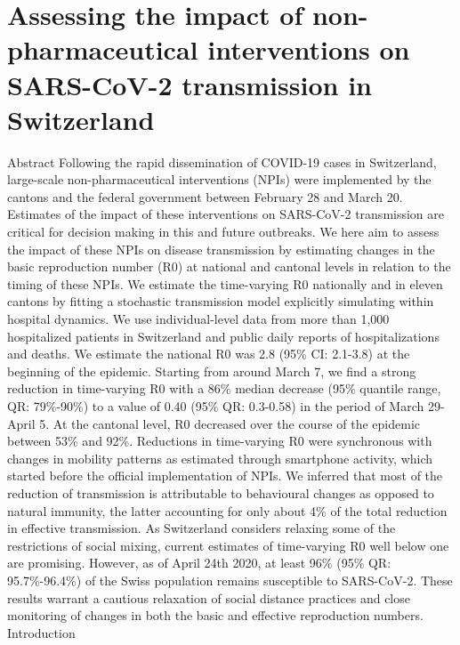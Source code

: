 \chapter{Assessing the impact of non-pharmaceutical interventions on SARS-CoV-2 transmission in Switzerland}
\label{ch:covid-switzerland-npi}

Abstract
Following the rapid dissemination of COVID-19 cases in Switzerland, large-scale non-pharmaceutical interventions (NPIs) were implemented by the cantons and the federal government between February 28 and March 20. Estimates of the impact of these interventions on SARS-CoV-2 transmission are critical for decision making in this and future outbreaks. We here aim to assess the impact of these NPIs on disease transmission by estimating changes in the basic reproduction number (R0) at national and cantonal levels in relation to the timing of these NPIs. We estimate the time-varying R0 nationally and in eleven cantons by fitting a stochastic transmission model explicitly simulating within hospital dynamics. We use  individual-level data from more than 1,000 hospitalized patients in Switzerland and public daily reports of hospitalizations and deaths. We estimate the national R0 was 2.8 (95\% CI: 2.1-3.8) at the beginning of the epidemic. Starting from around March 7, we find a strong reduction in time-varying R0 with a 86\% median decrease (95\% quantile range, QR: 79\%-90\%) to a value of 0.40 (95\% QR: 0.3-0.58) in the period of March 29-April 5. At the cantonal level, R0 decreased over the course of the epidemic between 53\% and 92\%. Reductions in time-varying R0 were synchronous with changes in mobility patterns as estimated through smartphone activity, which started before the official implementation of NPIs. We inferred that most of the reduction of transmission is attributable to behavioural changes as opposed to natural immunity, the latter accounting for only about 4\% of the total reduction in effective transmission. As Switzerland considers relaxing some of the restrictions of social mixing, current estimates of time-varying R0 well below one are promising. However, as of April 24th 2020, at least 96\% (95\% QR: 95.7\%-96.4\%) of the Swiss population remains susceptible to SARS-CoV-2. These results warrant a cautious relaxation of social distance practices and close monitoring of changes in both the basic and effective reproduction numbers. 
Introduction
